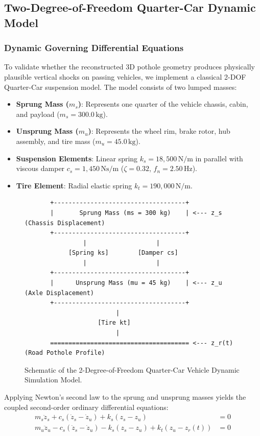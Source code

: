 \subsection{Two-Degree-of-Freedom Quarter-Car Dynamic Model}

\subsubsection{Dynamic Governing Differential Equations}
To validate whether the reconstructed 3D pothole geometry produces physically plausible vertical shocks on passing vehicles, we implement a classical 2-DOF Quarter-Car suspension model. The model consists of two lumped masses:
\begin{itemize}
    \item \textbf{Sprung Mass ($m_s$)}: Represents one quarter of the vehicle chassis, cabin, and payload ($m_s = 300.0\,\text{kg}$).
    \item \textbf{Unsprung Mass ($m_u$)}: Represents the wheel rim, brake rotor, hub assembly, and tire mass ($m_u = 45.0\,\text{kg}$).
    \item \textbf{Suspension Elements}: Linear spring $k_s = 18,500\,\text{N/m}$ in parallel with viscous damper $c_s = 1,450\,\text{Ns/m}$ ($\zeta = 0.32$, $f_n = 2.50\,\text{Hz}$).
    \item \textbf{Tire Element}: Radial elastic spring $k_t = 190,000\,\text{N/m}$.
\end{itemize}

\begin{figure}[h!]
\centering
\begin{verbatim}
       +------------------------------------+
       |       Sprung Mass (ms = 300 kg)    | <--- z_s (Chassis Displacement)
       +------------------------------------+
                |                   |
            [Spring ks]        [Damper cs]
                |                   |
       +------------------------------------+
       |      Unsprung Mass (mu = 45 kg)    | <--- z_u (Axle Displacement)
       +------------------------------------+
                         |
                    [Tire kt]
                         |
       ====================================== <--- z_r(t) (Road Pothole Profile)
\end{verbatim}
\caption{Schematic of the 2-Degree-of-Freedom Quarter-Car Vehicle Dynamic Simulation Model.}
\label{fig:quarter_car_schematic}
\end{figure}

Applying Newton's second law to the sprung and unsprung masses yields the coupled second-order ordinary differential equations:
\begin{align}
    m_s \ddot{z}_s + c_s (\dot{z}_s - \dot{z}_u) + k_s (z_s - z_u) &= 0 \label{eq:ode_sprung} \\
    m_u \ddot{z}_u - c_s (\dot{z}_s - \dot{z}_u) - k_s (z_s - z_u) + k_t (z_u - z_r(t)) &= 0 \label{eq:ode_unsprung}
\end{align}

